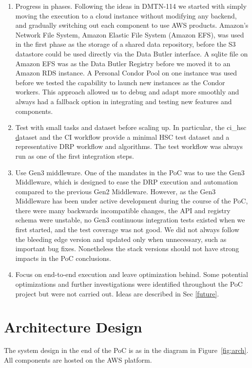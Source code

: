 \begin{enumerate}
\item
Progress in phases.
Following the ideas in DMTN-114 we started with simply moving the execution to a cloud instance without modifying any backend, and gradually switching out each component to use AWS products.
Amazon's Network File System, Amazon Elastic File System (Amazon EFS), was used in the first phase as the storage of a shared data repository, before the S3 datastore could be used directly via the Data Butler interface.
A sqlite file on Amazon EFS was as the Data Butler Registry before we moved it to an Amazon RDS instance.
A Personal Condor Pool on one instance was used before we tested the capability to launch new instances as the Condor workers.
This approach allowed us to debug and adapt more smoothly and always had a fallback option in integrating and testing new features and components.
\item
Test with small tasks and dataset before scaling up.
In particular, the ci\_hsc \href{https://github.com/lsst/ci\_hsc} dataset and the CI workflow provide a minimal HSC test dataset and a representative DRP workflow and algorithms.
The test workflow was always run as one of the first integration steps.
\item
Use Gen3 middleware.
One of the mandates in the PoC was to use the Gen3 Middleware, which is designed to ease the DRP execution and automation compared to the previous Gen2 Middleware.
However, as the Gen3 Middleware has been under active development during the course of the PoC, there were many backwards incompatible changes, the API and registry schema were unstable, no Gen3 continuous integration tests existed when we first started, and the test coverage was not good.
We did not always follow the bleeding edge version and updated only when unnecessary, such as important bug fixes.
Nonetheless the stack versions should not have strong impacts in the PoC conclusions.
\item
Focus on end-to-end execution and leave optimization behind.
Some potential optimizations and further investigations were identified throughout the PoC project but were not carried out.
Ideas are described in Sec \ref{future}.
\end{enumerate}


\section{Architecture Design}

The system design in the end of the PoC is as in the diagram in Figure~\ref{fig:arch}.
All components are hosted on the AWS platform.

